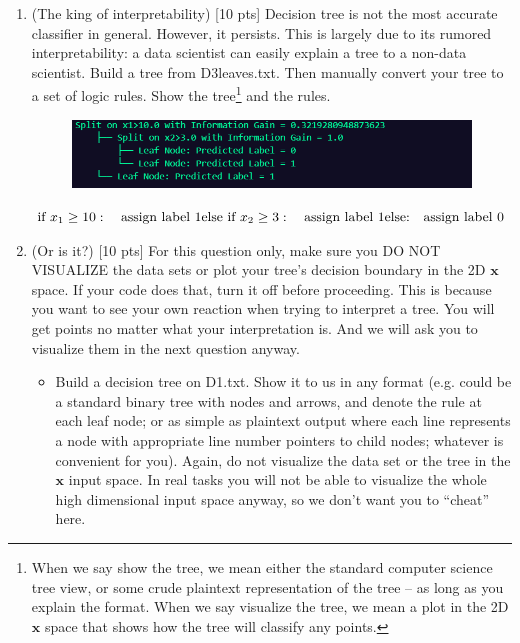 \documentclass[a4paper]{article}
\theoremstyle{definition}
\def\x{\mathbf x}
\begin{document}
\begin{enumerate}
\item (The king of interpretability)  [10 pts] Decision tree is not the most accurate classifier in general.  However, it persists.  This is largely due to its rumored interpretability: a data scientist can easily explain a tree to a non-data scientist.  Build a tree from D3leaves.txt.  Then manually convert your tree to a set of logic rules.  Show the tree\footnote{When we say show the tree, we mean either the standard computer science tree view, or some crude plaintext representation of the tree -- as long as you explain the format.  When we say visualize the tree, we mean a plot in the 2D $\x$ space that shows how the tree will classify any points.} and the rules. \\

\begin{figure}[h!]
	\centering
	\includegraphics[width=1.0\textwidth]{q4.png}  
	\captionsetup{labelformat=empty}
	\caption{}
	\label{fig:my_label}
\end{figure}



$	\text{if } x_1 \geq 10: \\
	\quad \text{assign label 1} \\
	\text{else if } x_2 \geq 3: \\
	\quad \text{assign label 1} \\
	\text{else:} \\
	\quad \text{assign label 0}$





\item (Or is it?)  [10 pts] For this question only, make sure you DO NOT VISUALIZE the data sets or plot your tree's decision boundary in the 2D $\x$ space.  If your code does that, turn it off before proceeding.  This is because you want to see your own reaction when trying to interpret a tree.  You will get points no matter what your interpretation is.
And we will ask you to visualize them in the next question anyway.
  \begin{itemize}
  
  \item Build a decision tree on D1.txt.  Show it to us in any format (e.g. could be a standard binary tree with nodes and arrows, and denote the rule at each leaf node; or as simple as plaintext output where each line represents a node with appropriate line number pointers to child nodes; whatever is convenient for you). Again, do not visualize the data set or the tree in the $\x$ input space.  In real tasks you will not be able to visualize the whole high dimensional input space anyway, so we don't want you to ``cheat'' here. 
  

\end{itemize}
\end{enumerate}
\end{document}
